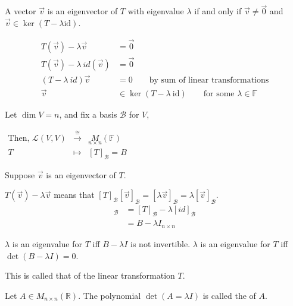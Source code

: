 \documentclass[11pt,fleqn]{book} %
\begin{document}
\setcounter{chapter}{4}
\setcounter{dummy}{4}
\begin{proposition}
    A vector $\overrightarrow{v}$ is an eigenvector of $T$ with eigenvalue $\lambda$ if and only if $\overrightarrow{v} \neq \overrightarrow{0}$ and $\overrightarrow{v} \in \ker(T - \lambda \mathrm{id})$.
\end{proposition}
\setcounter{chapter}{3}
\begin{align*}
    T(\overrightarrow{v}) - \lambda \overrightarrow{v}
    &= \overrightarrow{0}
    \\
    T(\overrightarrow{v}) - \lambda ~ id(\overrightarrow{v})
    &= \overrightarrow{0}
    \\
    (T-\lambda ~ id)\overrightarrow{v}
    &= 0
    \qquad\text{by sum of linear transformations}
    \\
    \overrightarrow{v} &\in \ker (T - \lambda ~ \mathrm{id}) \qquad\text{for some }\lambda \in \mathbb{F}
\end{align*}

Let $\dim V = n$, and fix a basis $\mathcal{B}$ for $V$,

$\begin{matrix}
\text{Then, }
\mathcal{L}(V, V)
&\overset{\cong}{\to}
&\underset{n \times n}M(\mathbb{F})
\\
T &\mapsto &[T]_\mathcal{B} = B
\end{matrix}$

Suppose $\overrightarrow{v}$ is an eigenvector of $T$.

$T(\overrightarrow{v}) - \lambda \overrightarrow{v}$ means that $[T]_\mathcal{B}[\overrightarrow{v}]_\mathcal{B} = [\lambda\overrightarrow{v}]_\mathcal{B} = \lambda [\overrightarrow{v}]_\mathcal{B}$.
\begin{align*}
    [T - \lambda ~ id]_\mathcal{B}
    &= [T]_\mathcal{B} - \lambda[id]_\mathcal{B}
    \\
    &={B - \lambda I}_{n \times n}
\end{align*}

$\lambda$ is an eigenvalue for $T$ iff $B - \lambda I$ is not invertible.
$\lambda$ is an eigenvalue for $T$ iff $\det (B - \lambda I) = 0$.

This is called that  of the linear transformation $T$.

\setcounter{chapter}{4}
\setcounter{definitionT}{10}
\begin{definition}
    Let $A \in M_{n \times n}(\mathbb{R})$. The polynomial $\det(A = \lambda I)$ is called the  of $A$.
\end{definition}
\setcounter{chapter}{3}
\end{document}
